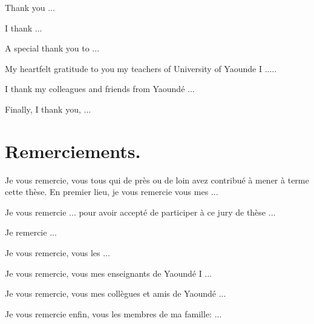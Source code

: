 \documentclass[a4paper,twoside,12pt]{book}
\begin{document}
Thank you ...

I thank ...

A special thank you to ...

My heartfelt gratitude to you my teachers of University of Yaounde I .....

I thank my colleagues and friends from Yaoundé ...

Finally, I thank you, ...

\newpage

\section*{Remerciements.}
Je vous remercie, vous tous qui de près ou de loin avez contribué à mener à terme cette thèse. En premier lieu, je vous remercie vous mes ...

Je vous remercie ... pour avoir accepté de participer à ce jury de thèse ...

Je remercie ...

Je vous remercie, vous les ...

Je vous remercie, vous mes enseignants de Yaoundé I ...

Je vous remercie, vous mes collègues et amis de Yaoundé ...


Je vous remercie enfin, vous les membres de ma famille: ...

\tableofcontents











\appendix

\end{document}
